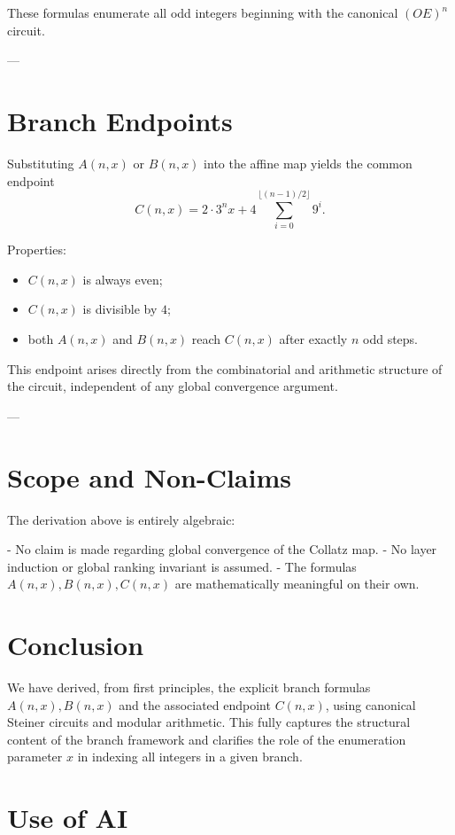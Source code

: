 \documentclass[12pt]{article}
\begin{document}
These formulas enumerate all odd integers beginning with the canonical
\((OE)^n\) circuit.

---

\section{Branch Endpoints}

Substituting \(A(n,x)\) or \(B(n,x)\) into the affine map yields the common
endpoint
\[
C(n,x) = 2 \cdot 3^n x + 4 \sum_{i=0}^{\lfloor (n-1)/2 \rfloor} 9^i.
\]

Properties:

\begin{itemize}
\item \(C(n,x)\) is always even;
\item \(C(n,x)\) is divisible by \(4\);
\item both \(A(n,x)\) and \(B(n,x)\) reach \(C(n,x)\) after exactly \(n\)
odd steps.
\end{itemize}

This endpoint arises directly from the combinatorial and arithmetic structure
of the circuit, independent of any global convergence argument.

---

\section{Scope and Non-Claims}

The derivation above is entirely algebraic:

- No claim is made regarding global convergence of the Collatz map.
- No layer induction or global ranking invariant is assumed.
- The formulas \(A(n,x), B(n,x), C(n,x)\) are mathematically meaningful on
their own.

\section{Conclusion}

We have derived, from first principles, the explicit branch formulas
\(A(n,x), B(n,x)\) and the associated endpoint \(C(n,x)\), using canonical
Steiner circuits and modular arithmetic. This fully captures the structural
content of the branch framework and clarifies the role of the enumeration
parameter \(x\) in indexing all integers in a given branch.

\appendix

\section{Use of AI}
\end{document}
